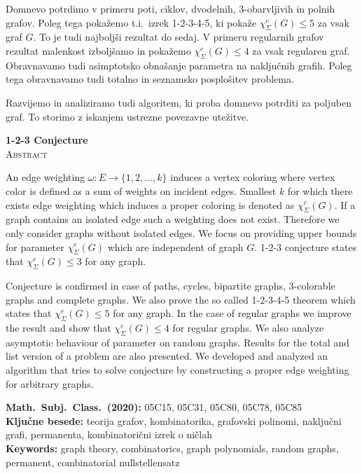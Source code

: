 \documentclass[12pt,a4paper,twoside]{article}
\newcommand{\kljucnebesede}{teorija grafov\sep kombinatorika\sep grafovski polinomi\sep naključni grafi\sep permanenta\sep kombinatorični izrek o ničlah} %
\newcommand{\keywords}{graph theory\sep combinatorics\sep graph polynomials\sep random graphs\sep permanent\sep combinatorial nullstellensatz} %
\newcommand{\sep}{, }  %
\theoremstyle{definition} %
\theoremstyle{plain} %
\newcommand{\ec}{\chi_{\Sigma}^e}
\numberwithin{equation}{section}  %
\begin{document}
Domnevo potrdimo v primeru poti, ciklov, dvodelnih, $3$-obarvljivih in polnih grafov. Poleg tega pokažemo t.i.\ izrek 1-2-3-4-5, ki pokaže $\ec(G) \le 5$ za vsak graf $G$. To je tudi najboljši rezultat do sedaj. V primeru regularnih grafov rezultat malenkost izboljšamo in pokažemo $\ec(G) \le 4$ za vsak regularen graf. Obravnavamo tudi asimptotsko obnašanje parametra na naključnih grafih. Poleg tega obravnavamo tudi totalno in seznamsko posplošitev problema.

Razvijemo in analiziramo tudi algoritem, ki proba domnevo potrditi za poljuben graf. To storimo z iskanjem ustrezne povezavne utežitve.

\vfill
\begin{center}
\textbf{1-2-3 Conjecture} \\[3mm] %
\textsc{Abstract}\\[2mm]
\end{center}
An edge weighting $\omega : E \rightarrow \{1,2, \ldots, k\}$ induces a vertex coloring where vertex color is defined as a sum of weights on incident edges. Smallest $k$ for which there exists edge weighting which induces a proper coloring is denoted as $\ec(G)$. If a graph contains an isolated edge such a weighting does not exist. Therefore we only consider graphs without isolated edges. We focus on providing upper bounds for parameter $\ec(G)$ which are independent of graph $G$. 1-2-3 conjecture states that $\ec(G) \le 3$ for any graph.

Conjecture is confirmed in case of paths, cycles, bipartite graphs,  $3$-colorable graphs and complete graphs. We also prove the so called 1-2-3-4-5 theorem which states that $\ec(G) \le 5$ for any graph. In the case of regular graphs we improve the result and show that $\ec(G) \le 4$ for regular graphs. We also analyze asymptotic behaviour of parameter on random graphs. Results for the total and list version of a problem are also presented.
We developed and analyzed an algorithm that tries to solve conjecture by constructing a proper edge weighting for arbitrary graphs.


\vfill\noindent
\textbf{Math.~Subj.~Class.~(2020):} 05C15, 05C31, 05C80, 05C78, 05C85
\ \\[1mm]
\textbf{Ključne besede:} \kljucnebesede \\[1mm]
\textbf{Keywords:} \keywords

\cleardoublepage

\setcounter{page}{1}    %
\end{document}
